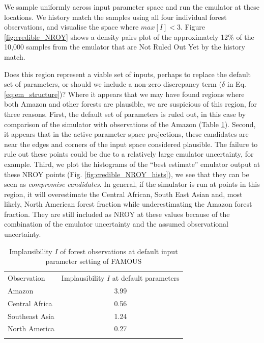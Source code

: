 \documentclass[esd, manuscript]{copernicus}
\begin{document}
We sample uniformly across input parameter space and run the emulator at these locations. We history match the samples using all four individual forest observations, and visualise the space where $max[I] < 3$. Figure \ref{fig:credible_NROY} shows a density pairs plot of the approximately 12\% of the 10,000 samples from the emulator that are Not Ruled Out Yet by the history match.


Does this region represent a viable set of inputs, perhaps to replace the default set of parameters, or should we include a non-zero discrepancy term ($\delta$ in Eq. \ref{eq:em_structure})? Where it appears that we may have found regions where both Amazon and other forests are plausible, we are suspicious of this region, for three reasons. First, the default set of parameters is ruled out, in this case by comparison of the simulator with observations of the Amazon (Table \ref{tab:default_parameter_implausibility}). Second, it appears that in the active parameter space projections, these candidates are near the edges and corners of the input space considered plausible. The failure to rule out these points could be due to a relatively large emulator uncertainty, for example. Third, we plot the histograms of the ``best estimate'' emulator output at these NROY points (Fig. \ref{fig:credible_NROY_hists}), we see that they can be seen as \emph{compromise candidates}. In general, if the simulator is run at points in this region, it will overestimate the Central African, South East Asian and, most likely, North American forest fraction while underestimating the Amazon forest fraction. They are still included as NROY at these values because of the combination of the emulator uncertainty and the assumed observational uncertainty.

\begin{table}[t]
\caption{Implausibility $I$ of forest observations at default input parameter setting of FAMOUS}\label{tab:default_parameter_implausibility}
\begin{tabular}{lc}

\tophline
Observation &  Implausibility $I$ at default parameters \\
Amazon & 3.99 \\
Central Africa & 0.56 \\
Southeast Asia & 1.24 \\
North America & 0.27 \\
\bottomhline
\end{tabular}
\belowtable{} %
\end{table}
\end{document}
